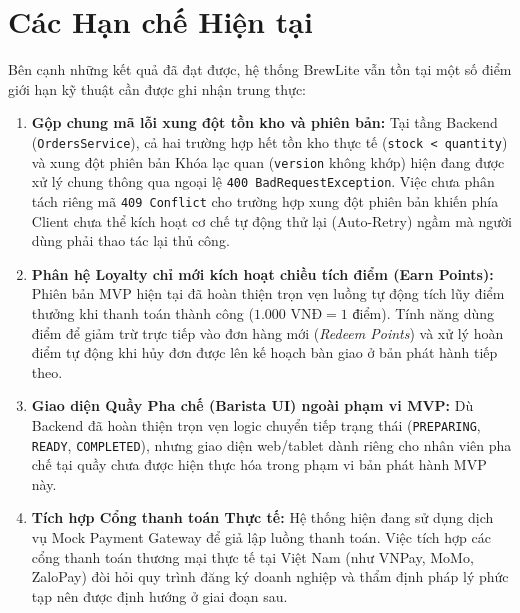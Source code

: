 \section{Các Hạn chế Hiện tại}
Bên cạnh những kết quả đã đạt được, hệ thống BrewLite vẫn tồn tại một số điểm giới hạn kỹ thuật cần được ghi nhận trung thực:
\begin{enumerate}
    \item \textbf{Gộp chung mã lỗi xung đột tồn kho và phiên bản:} Tại tầng Backend (\texttt{OrdersService}), cả hai trường hợp hết tồn kho thực tế (\texttt{stock < quantity}) và xung đột phiên bản Khóa lạc quan (\texttt{version} không khớp) hiện đang được xử lý chung thông qua ngoại lệ \texttt{400 BadRequestException}. Việc chưa phân tách riêng mã \texttt{409 Conflict} cho trường hợp xung đột phiên bản khiến phía Client chưa thể kích hoạt cơ chế tự động thử lại (Auto-Retry) ngầm mà người dùng phải thao tác lại thủ công.
    \item \textbf{Phân hệ Loyalty chỉ mới kích hoạt chiều tích điểm (Earn Points):} Phiên bản MVP hiện tại đã hoàn thiện trọn vẹn luồng tự động tích lũy điểm thưởng khi thanh toán thành công (\(1.000 \text{ VNĐ} = 1 \text{ điểm}\)). Tính năng dùng điểm để giảm trừ trực tiếp vào đơn hàng mới (\textit{Redeem Points}) và xử lý hoàn điểm tự động khi hủy đơn được lên kế hoạch bàn giao ở bản phát hành tiếp theo.
    \item \textbf{Giao diện Quầy Pha chế (Barista UI) ngoài phạm vi MVP:} Dù Backend đã hoàn thiện trọn vẹn logic chuyển tiếp trạng thái (\texttt{PREPARING}, \texttt{READY}, \texttt{COMPLETED}), nhưng giao diện web/tablet dành riêng cho nhân viên pha chế tại quầy chưa được hiện thực hóa trong phạm vi bản phát hành MVP này.
    \item \textbf{Tích hợp Cổng thanh toán Thực tế:} Hệ thống hiện đang sử dụng dịch vụ Mock Payment Gateway để giả lập luồng thanh toán. Việc tích hợp các cổng thanh toán thương mại thực tế tại Việt Nam (như VNPay, MoMo, ZaloPay) đòi hỏi quy trình đăng ký doanh nghiệp và thẩm định pháp lý phức tạp nên được định hướng ở giai đoạn sau.
\end{enumerate}

